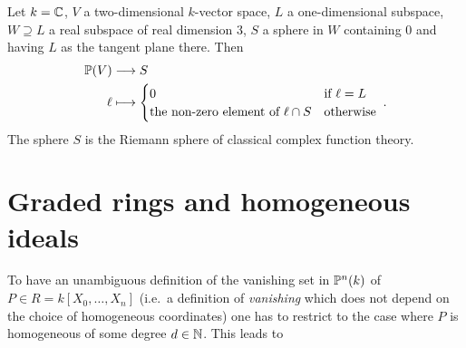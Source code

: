 \documentclass[a4paper,parskip=half,numbers=enddot, DIV=12]{scrreprt}
\begin{document}
\begin{example}
    Let $k=\mathbb{C}$, $V$ a two-dimensional $k$-vector space, $L$ a one-dimensional subspace, $W\supseteq L$ a real subspace of real dimension 3, $S$ a sphere in $W$ containing $0$ and having $L$ as the tangent plane there. Then 
    \begin{align*}
        \IP(V) &\morphism S\\
        \ell &\longmapsto \begin{cases} 0 &\text{if } \ell= L\\
        \text{the non-zero element of }\ell\cap S &\text{otherwise}\end{cases}\;.
    \end{align*}    
    The sphere $S$ is the Riemann sphere of classical complex function theory.
\end{example}


\section{Graded rings and homogeneous ideals}

To have an unambiguous definition of the vanishing set in $\mathbb{P}^n(k)$ of $P\in R=k[X_0,\ldots,X_n]$ (i.e.\ a definition of \emph{vanishing} which does not depend on the choice of homogeneous coordinates) one has to restrict to the case where $P$ is homogeneous of some degree $d\in\mathbb{N}$. This leads to
\end{document}

